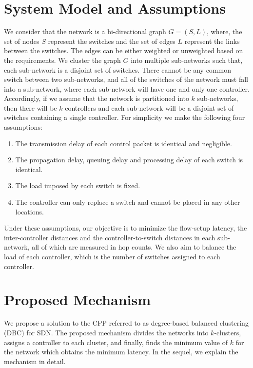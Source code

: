 \documentclass{IEEEtran}
\begin{document}
	
	
	\section{System Model and Assumptions} \label{sysMod}
	
	We consider that the network is a bi-directional graph $G=(S, L)$, where, the set of nodes $S$ represent the switches and the set of edges $L$ represent the links between the switches. The edges can be either weighted or unweighted based on the requirements. We cluster the graph $G$ into multiple sub-networks such that, each sub-network is a disjoint set of switches. There cannot be any common switch between two sub-networks, and all of the switches of the network must fall into a sub-network, where each sub-network will have one and only one controller. Accordingly, if we assume that the network is partitioned into $k$ sub-networks, then there will be $k$ controllers and each sub-network will be a disjoint set of switches containing a single controller. For simplicity we make the following four assumptions:
	\begin{enumerate}
		\item The transmission delay of each control packet is identical and negligible.
		\item The propagation delay, queuing delay and processing delay of each switch is identical.
		\item The load imposed by each switch is fixed.
		\item The controller can only replace a switch and cannot be placed in any other locations.
	\end{enumerate}
	Under these assumptions, our objective is to minimize the flow-setup latency, the inter-controller distances and the controller-to-switch distances in each sub-network, all of which are measured in hop counts. We also aim to balance the load of each controller, which is the number of switches assigned to each controller.
	
	\section{Proposed Mechanism} \label{proposedalgo}
	
	We propose a solution to the CPP referred to as degree-based balanced clustering (DBC) for SDN. The proposed mechanism divides the networks into $k$-clusters, assigns a controller to each cluster, and finally, finds the minimum value of $k$ for the network which obtains the minimum latency. In the sequel, we explain the mechanism in detail.
	
\end{document}
